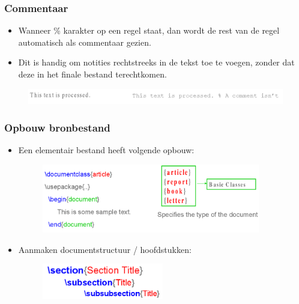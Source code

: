 \documentclass{beamer}
\begin{document}
\begin{frame}
\frametitle{Commentaar}
\begin{itemize}
 \item Wanneer \% karakter op een regel staat, dan wordt de rest van de regel automatisch als commentaar gezien.
 \item Dit is handig om notities rechtstreeks in de tekst toe te voegen, zonder dat deze in het finale bestand terechtkomen.
\end{itemize}
\begin{figure}[h] 
  \includegraphics[width=1\textwidth]{images/comment.png}
\end{figure}
\end{frame}


\begin{frame}
\frametitle{Opbouw bronbestand}
\begin{itemize}[<+->]
 \item Een elementair bestand heeft volgende opbouw:
 \begin{figure}[h] 
  \includegraphics[width=0.9\textwidth]{images/bestand.png}
\end{figure}
 \item Aanmaken documentstructuur / hoofdstukken:
  \begin{figure}[h] 
  \includegraphics[width=0.5\textwidth]{images/sections.png}
\end{figure}
\end{itemize}
\end{frame}

\end{document}
